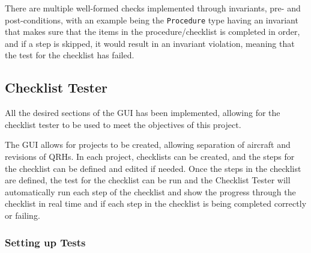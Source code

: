 \documentclass[../dissertation.tex]{subfiles}
\begin{document}
There are multiple well-formed checks implemented through invariants,
pre- and post-conditions, with an example being the \lstinline|Procedure| type
having an invariant that makes sure that the items in the procedure/checklist is
completed in order, and if a step is skipped, it would result in an invariant violation,
meaning that the test for the checklist has failed.

\subsection{Checklist Tester}

All the desired sections of the GUI has been implemented, allowing for
the checklist tester to be used to meet the objectives of this project.

The GUI allows for projects to be created, allowing separation of aircraft and
revisions of QRHs. In each project, checklists can be created, and the steps
for the checklist can be defined and edited if needed. Once the steps in
the checklist are defined, the test for the checklist can be run
and the Checklist Tester will automatically run each step of the checklist
and show the progress through the checklist in real time and if each step
in the checklist is being completed correctly or failing.

\subsubsection{Setting up Tests}
\end{document}
